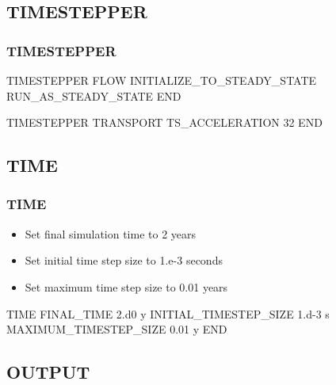 \documentclass{beamer}
\begin{document}
\subsection{TIMESTEPPER}

\begin{frame}[fragile]\frametitle{\bf TIMESTEPPER}

\begin{semiverbatim}
TIMESTEPPER FLOW
  INITIALIZE_TO_STEADY_STATE
  RUN_AS_STEADY_STATE
END

TIMESTEPPER TRANSPORT
  TS_ACCELERATION 32
END
\end{semiverbatim}

\end{frame}
\subsection{TIME}

\begin{frame}[fragile]\frametitle{\bf TIME}

\begin{itemize}
\item Set final simulation time to 2 years
\item Set initial time step size to 1.e-3 seconds
\item Set maximum time step size to 0.01 years
\end{itemize}

\begin{semiverbatim}

TIME
  FINAL_TIME 2.d0 y
  INITIAL_TIMESTEP_SIZE 1.d-3 s
  MAXIMUM_TIMESTEP_SIZE 0.01 y
END
\end{semiverbatim}

\end{frame}

\subsection{OUTPUT}
\end{document}
